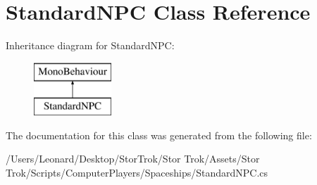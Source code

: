 \hypertarget{class_standard_n_p_c}{}\section{Standard\+N\+PC Class Reference}
\label{class_standard_n_p_c}
Inheritance diagram for Standard\+N\+PC\+:\begin{figure}[H]
\begin{center}
\leavevmode
\includegraphics[height=2.000000cm]{class_standard_n_p_c}
\end{center}
\end{figure}


The documentation for this class was generated from the following file\+:\begin{DoxyCompactItemize}
\item 
/\+Users/\+Leonard/\+Desktop/\+Stor\+Trok/\+Stor Trok/\+Assets/\+Stor Trok/\+Scripts/\+Computer\+Players/\+Spaceships/Standard\+N\+P\+C.\+cs\end{DoxyCompactItemize}
